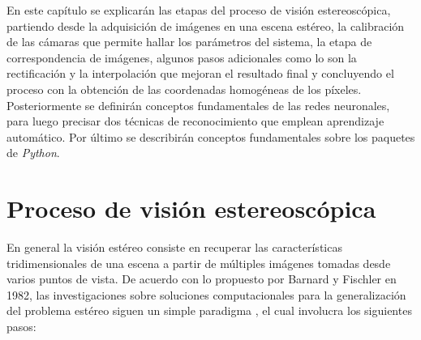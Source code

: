 En este capítulo se explicarán las etapas del proceso de visión estereoscópica, partiendo desde la adquisición de imágenes en una escena estéreo, la calibración de las cámaras que permite hallar los parámetros del sistema, la etapa de correspondencia de imágenes, algunos pasos adicionales como lo son la rectificación y la interpolación que mejoran el resultado final y concluyendo el proceso con la obtención de las coordenadas homogéneas de los píxeles. Posteriormente se definirán conceptos fundamentales de las redes neuronales, para luego precisar dos técnicas de reconocimiento que emplean aprendizaje automático. Por último se describirán conceptos fundamentales sobre los paquetes de \textit{Python}.
\section{Proceso de visión estereoscópica}
 En general la visión estéreo consiste en recuperar las características tridimensionales de una escena a partir de múltiples imágenes tomadas desde varios puntos de vista. De acuerdo con lo propuesto por Barnard y Fischler en 1982, las investigaciones sobre soluciones computacionales para la generalización del problema estéreo siguen un simple paradigma \cite{Barnard1982}, el cual involucra los siguientes pasos:
